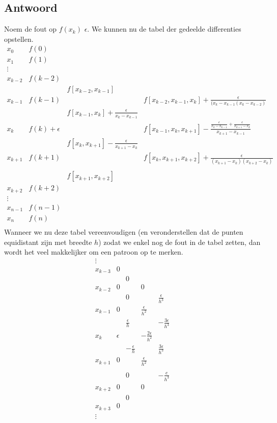 \documentclass[examenvragen.tex]{subfiles}
\begin{document}
\subsection{Antwoord}
Noem de fout op $f(x_k)$ $\epsilon$. We kunnen nu de tabel der gedeelde differenties opstellen.
\[
\begin{array}{cccccccccc}
x_0 & f(0) \\
x_1 & f(1) \\
\vdots\\
x_{k-2} & f(k-2) \\
&& f[x_{k-2},x_{k-1}]\\
x_{k-1} & f(k-1) && f[x_{k-2},x_{k-1},x_{k}] + \frac{\epsilon}{(x_{k}-x_{k-1}(x_{k}-x_{k-2})}\\
&& f[x_{k-1},x_{k}] + \frac{\epsilon}{x_k-x_{k-1}}\\
x_{k} & f(k) +\epsilon && f[x_{k-1},x_{k},x_{k+1}] -\frac{\frac{\epsilon}{x_k-x_{k-1}}+\frac{\epsilon}{x_{k+1}-x_{k}}}{x_{k+1}-x_{k-1}}\\
&& f[x_{k},x_{k+1}] - \frac{\epsilon}{x_{k+1}-x_{k}}\\
x_{k+1} & f(k+1) && f[x_{k},x_{k+1},x_{k+2}] + \frac{\epsilon}{(x_{k+1}-x_{k})(x_{k+2}-x_{k})}\\\\
&& f[x_{k+1},x_{k+2}]\\
x_{k+2} & f(k+2) \\
\vdots\\
x_{n-1} & f(n-1) \\
x_n & f(n) \\
\end{array}
\]
Wanneer we nu deze tabel vereenvoudigen (en veronderstellen dat de punten equidistant zijn met breedte $h$) zodat we enkel nog de fout in de tabel zetten, dan wordt het veel makkelijker om een patroon op te merken.
\[
\begin{array}{cccccccccc}
\vdots\\
x_{k-3} & 0 \\
&& 0 \\
x_{k-2} & 0 && 0\\
&& 0 && \frac{\epsilon}{h^3}\\
x_{k-1} & 0 && \frac{\epsilon}{h^2}\\
&& \frac{\epsilon}{h} && -\frac{3\epsilon}{h^3}\\
x_{k} & \epsilon && -\frac{2\epsilon}{h^2}\\
&& - \frac{\epsilon}{h}&& \frac{3\epsilon}{h^3}\\
x_{k+1} & 0 && \frac{\epsilon}{h^2}\\\\
&& 0 && -\frac{e}{h^3}\\
x_{k+2} & 0 && 0\\
&& 0\\
x_{k+3} & 0 \\
\vdots\\
\end{array}
\]
\end{document}
